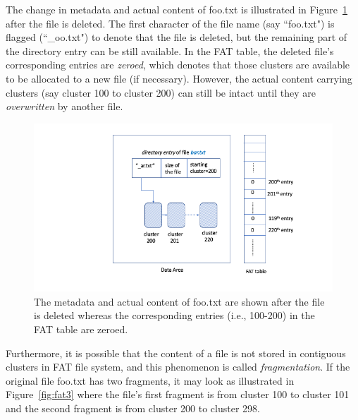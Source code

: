 \begin{paraphrase}
The change in metadata and actual content of foo.txt is illustrated in Figure~\ref{fig:fat2} after the file is deleted.
The first character of the file name (say ``foo.txt") is flagged (``\_oo.txt") to denote that the file is deleted, 
but the remaining part of the directory entry can be still available. In the FAT table, the deleted file's corresponding
entries are \emph{zeroed}, which denotes that those clusters are available to be allocated to a new file (if necessary).
However, the actual content carrying clusters (say cluster 100 to cluster 200)
can still be intact until they are \emph{overwritten} by another file. 
  
\begin{figure}[h]
    \centering
    \includegraphics[width=\linewidth]{fig/fat2.png}
    \caption{The metadata and actual content of foo.txt are shown after the file is deleted whereas the corresponding entries (i.e., 100-200) in the FAT table are zeroed.}
    \label{fig:fat2}
\end{figure}

Furthermore, it is possible that the content of a file is not stored in contiguous clusters in FAT file system, 
and this phenomenon is called \emph{fragmentation}.
If the original file foo.txt has two fragments, it may look as illustrated in Figure~\ref{fig:fat3} where the file's first fragment is from cluster 100 to cluster 101 and the 
second fragment is from cluster 200 to cluster 298. 


\end{paraphrase}
